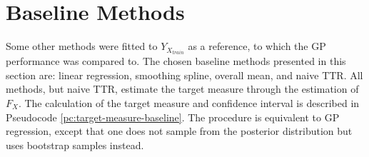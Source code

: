 \section{Baseline Methods}\label{sec:baseline-methods}

Some other methods were fitted to $Y_{X_{train}}$ as a reference, to which
the GP performance was compared to.
The chosen baseline methods presented in this section are: linear regression,
smoothing spline, overall mean, and naive TTR.
All methods, but naive TTR, estimate the target measure through the estimation of $F_X$.
The calculation of the target measure and confidence interval is described in
Pseudocode \ref{pc:target-measure-baseline}.
The procedure is equivalent to GP regression, except that one does not sample from
the posterior distribution but uses bootstrap samples instead.


